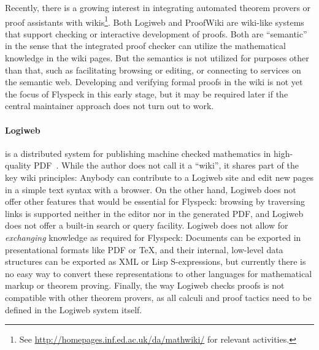 \documentclass{llncs}
\begin{document}
Recently, there is a growing interest in integrating automated theorem provers or proof
assistants with wikis\footnote{See \url{http://homepages.inf.ed.ac.uk/da/mathwiki/} for
  relevant activities.}.  Both Logiweb and ProofWiki are wiki-like systems that support
checking or interactive development of proofs.  Both are ``semantic'' in the sense that
the integrated proof checker can utilize the mathematical knowledge in the wiki pages.
But the semantics is not utilized for purposes other than that, such as facilitating
browsing or editing, or connecting to services on the semantic web.  Developing and
verifying formal proofs in the wiki is not yet the focus of Flyspeck in this early stage,
but it may be required later if the central maintainer approach does not turn out to work.

\paragraph{Logiweb} is a distributed system for publishing machine checked mathematics in
high-quality PDF~\cite{Grue:Logiweb07}.  While the author does not call it a ``wiki'', it
shares part of the key wiki principles: Anybody can contribute to a Logiweb site and edit
new pages in a simple text syntax with a browser.  On the other hand, Logiweb does not
offer other features that would be essential for Flyspeck: browsing by traversing links is
supported neither in the editor nor in the generated PDF, and Logiweb does not offer a
built-in search or query facility.  Logiweb does not allow for \emph{exchanging} knowledge
as required for Flyspeck: Documents can be exported in presentational formats like PDF or
\TeX{}, and their internal, low-level data structures can be exported as XML or Lisp
S-expressions, but currently there is no easy way to convert these representations to
other languages for mathematical markup or theorem proving.  Finally, the way Logiweb
checks proofs is not compatible with other theorem provers, as all calculi and proof
tactics need to be defined in the Logiweb system itself.
\end{document}
